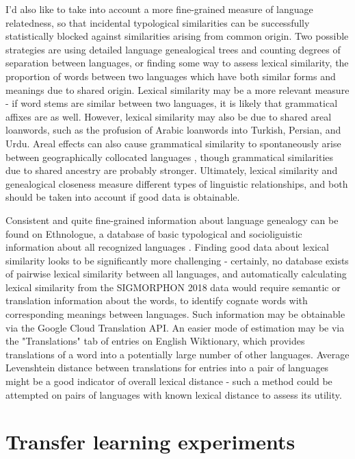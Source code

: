 I'd also like to take into account a more fine-grained measure of language relatedness, so that incidental typological similarities can be successfully statistically blocked against similarities arising from common origin. Two possible strategies are using detailed language genealogical trees and counting degrees of separation between languages, or finding some way to assess lexical similarity, the proportion of words between two languages which have both similar forms and meanings due to shared origin. Lexical similarity may be a more relevant measure - if word stems are similar between two languages, it is likely that grammatical affixes are as well. However, lexical similarity may also be due to shared areal loanwords, such as the profusion of Arabic loanwords into Turkish, Persian, and Urdu. Areal effects can also cause grammatical similarity to spontaneously arise between geographically collocated languages \parencite{Ponti2018}, though grammatical similarities due to shared ancestry are probably stronger. Ultimately, lexical similarity and genealogical closeness measure different types of linguistic relationships, and both should be taken into account if good data is obtainable.

Consistent and quite fine-grained information about language genealogy can be found on Ethnologue, a database of basic typological and socioliguistic information about all recognized languages \parencite{Ethnologue}. Finding good data about lexical similarity looks to be significantly more challenging - certainly, no database exists of pairwise lexical similarity between all languages, and automatically calculating lexical similarity from the SIGMORPHON 2018 data would require semantic or translation information about the words, to identify cognate words with corresponding meanings between languages. Such information may be obtainable via the Google Cloud Translation API. An easier mode of estimation may be via the "Translations" tab of entries on English Wiktionary, which provides translations of a word into a potentially large number of other languages. Average Levenshtein distance between translations for entries into a pair of languages might be a good indicator of overall lexical distance - such a method could be attempted on pairs of languages with known lexical distance to assess its utility.

\section{Transfer learning experiments}

